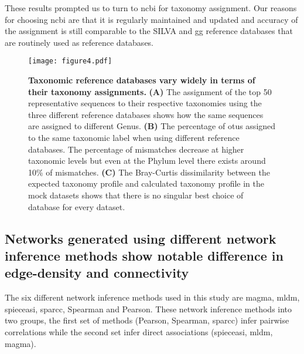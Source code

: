   These results prompted us to turn to \ac{ncbi} for taxonomy assignment.
  Our reasons for choosing \ac{ncbi} are that it is regularly maintained and updated and accuracy of the assignment is still comparable to the SILVA and \ac{gg} reference databases that are routinely used as reference databases.

  \begin{figure}[h]
    \centering
    \texttt{[image: figure4.pdf]}
    \caption{
      \textbf{Taxonomic reference databases vary widely in terms of their taxonomy assignments.}
      \textbf{(A)} The assignment of the top 50 representative sequences to their respective taxonomies using the three different reference databases shows how the same sequences are assigned to different Genus.
      \textbf{(B)} The percentage of \ac{otu}s assigned to the same taxonomic label when using different reference databases.
      The percentage of mismatches decrease at higher taxonomic levels but even at the Phylum level there exists around 10\% of mismatches.
      \textbf{(C)} The Bray-Curtis dissimilarity between the expected taxonomy profile and calculated taxonomy profile in the mock datasets shows that there is no singular best choice of database for every dataset.
    }
    \label{fig:figure4}
  \end{figure}

  \FloatBarrier

  \subsection*{Networks generated using different network inference methods show notable difference in edge-density and connectivity}

  The six different network inference methods used in this study are \ac{magma}, \ac{mldm}, \ac{spieceasi}, \ac{sparcc}, Spearman and Pearson.
  These network inference methods into two groups, the first set of methods (Pearson, Spearman, \ac{sparcc}) infer pairwise correlations while the second set infer direct associations (\ac{spieceasi}, \ac{mldm}, \ac{magma}).

